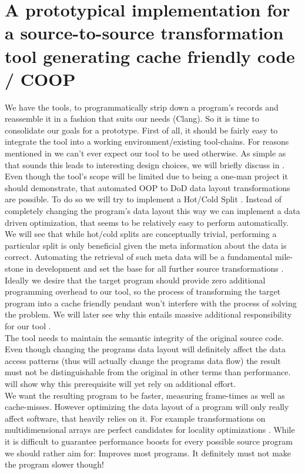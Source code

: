 \chapter{A prototypical implementation for a source-to-source transformation tool generating cache friendly code / COOP}\label{prototype}
We have the tools, to programmatically strip down a program's records and reassemble it in a fashion that suits our needs (Clang). So it is time to consolidate our goals for a prototype. First of all, it should be fairly easy to integrate the tool into a working environment/existing tool-chains. For reasons mentioned in  we can't ever expect our tool to be used otherwise. As simple as that sounds this leads to interesting design choices, we will briefly discuss in .\\
Even though the tool's scope will be limited due to being a one-man project it should demonstrate, that automated OOP to DoD data layout transformations are possible. To do so we will try to implement a Hot/Cold Split . Instead of completely changing the program's data layout this way we can implement a data driven optimization, that seems to be relatively easy to perform automatically. We will see that while hot/cold splits are conceptually trivial, performing a particular split is only beneficial given the meta information about the data is correct. Automating the retrieval of such meta data will be a fundamental mile-stone in development and set the base for all further source transformations .\\
Ideally we desire that the target program should provide zero additional programming overhead to our tool, so the process of transforming the target program into a cache friendly pendant won't interfere with the process of solving the problem. We will later see why this entails massive additional responsibility for our tool .\\
The tool needs to maintain the semantic integrity of the original source code. Even though changing the programs data layout will definitely affect the data access patterns (thus will actually change the programs data flow) the result must not be distinguishable from the original in other terms than performance.  will show why this prerequisite will yet rely on additional effort.\\
We want the resulting program to be faster, measuring frame-times as well as cache-misses. However optimizing the data layout of a program will only really affect software, that heavily relies on it. For example transformations on multidimensional arrays are perfect candidates for locality optimizations . While it is difficult to guarantee performance boosts for every possible source program we should rather aim for: Improves most programs. It definitely must not make the program slower though! 
\newpage
